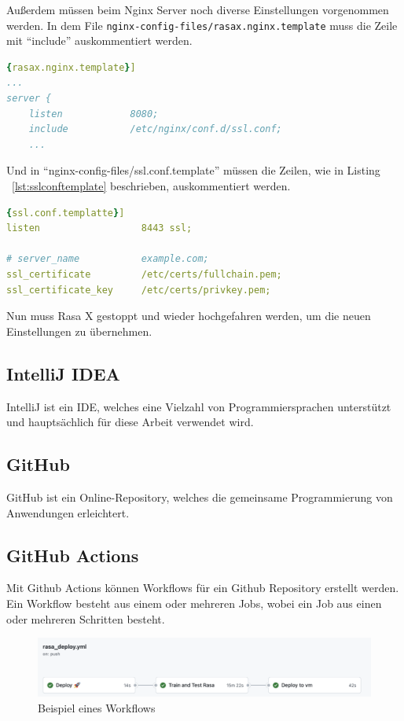 Außerdem müssen beim Nginx Server noch diverse Einstellungen vorgenommen werden.
In dem File \texttt{nginx-config-files/rasax.nginx.template} muss die Zeile mit ``include'' auskommentiert werden.

\begin{lstlisting}[language=yaml,label={lst:rasaxnginxtemplate},caption={rasax.nginx.template}]{rasax.nginx.template}]
...
server {
    listen            8080;
    include           /etc/nginx/conf.d/ssl.conf;
    ...
\end{lstlisting}

Und in ``nginx-config-files/ssl.conf.template'' müssen die Zeilen, wie in Listing ~\ref{lst:sslconftemplate} beschrieben, auskommentiert werden.

\begin{lstlisting}[language=yaml,label={lst:sslconftemplate},caption={ssl.conf.template}]{ssl.conf.templatte}]
listen                  8443 ssl;

# server_name           example.com;
ssl_certificate         /etc/certs/fullchain.pem;
ssl_certificate_key     /etc/certs/privkey.pem;
\end{lstlisting}

Nun muss Rasa X gestoppt und wieder hochgefahren werden, um die neuen Einstellungen zu übernehmen.

\subsection{IntelliJ IDEA}
IntelliJ ist ein IDE, welches eine Vielzahl von Programmiersprachen unterstützt und hauptsächlich für diese Arbeit verwendet wird.

\subsection{GitHub}
GitHub ist ein Online-Repository, welches die gemeinsame Programmierung von Anwendungen erleichtert.

\subsection{GitHub Actions}\label{subsec:github-actions}
Mit Github Actions können Workflows für ein Github Repository erstellt werden.
Ein Workflow besteht aus einem oder mehreren Jobs, wobei ein Job aus einen oder mehreren Schritten besteht.

\begin{figure}[hbt!]
    \centering
    \includegraphics[scale=0.5]{pics/ghActions}
    \caption{Beispiel eines Workflows}
    \label{fig:impl:ghActions}
\end{figure}

